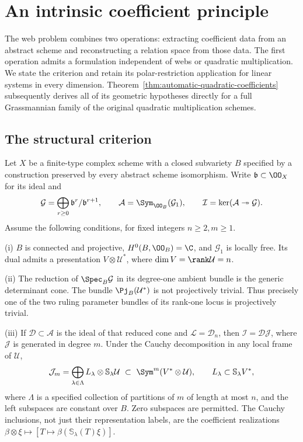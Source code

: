 \section{An intrinsic coefficient principle}
\label{sec:structural-coefficient-principle}

The web problem combines two operations: extracting coefficient data
from an abstract scheme and reconstructing a relation space from those
data.  The first operation admits a formulation independent of webs or
quadratic multiplication.  We state the criterion and retain its
polar-restriction application for linear systems in every dimension.
Theorem~\ref{thm:automatic-quadratic-coefficients} subsequently derives
all of its geometric hypotheses directly for a full Grassmannian
family of the original quadratic multiplication schemes.

\subsection{The structural criterion}

Let \(X\) be a finite-type complex scheme with a closed subvariety
\(B\) specified by a construction preserved by every abstract scheme
isomorphism.  Write \(\mathfrak b\subset\OO_X\) for its ideal and
\[
 \mathcal G=\bigoplus_{r\ge0}\mathfrak b^r/\mathfrak b^{r+1},
 \qquad \mathcal A=\Sym_{\OO_B}(\mathcal G_1),
 \qquad \mathcal I=\ker(\mathcal A\twoheadrightarrow\mathcal G).
\]
Assume the following conditions, for fixed integers \(n\ge2,m\ge1\).

\smallskip
\noindent\textup{(i)} \(B\) is connected and projective,
\(H^0(B,\OO_B)=\C\), and \(\mathcal G_1\) is locally free.
Its dual admits a presentation \(V\otimes\mathcal U^*\), where
\(\dim V=\rank\mathcal U=n\).

\smallskip
\noindent\textup{(ii)} The reduction of \(\Spec_B\mathcal G\)
in its degree-one ambient bundle is the generic determinant cone.
The bundle \(\Pj_B(\mathcal U^*)\) is not projectively trivial.
Thus precisely one of the two ruling parameter bundles of its rank-one
locus is projectively trivial.

\smallskip
\noindent\textup{(iii)} If \(\mathcal D\subset\mathcal A\)
is the ideal of that reduced cone and \(\mathcal L=\mathcal D_n\),
then \(\mathcal I=\mathcal D\mathcal J\), where
\(\mathcal J\) is generated in degree \(m\).  Under the Cauchy
decomposition in any local frame of \(\mathcal U\),
\begin{equation}\label{eq:structural-coefficient-hypothesis}
 \mathcal J_m=
 \bigoplus_{\lambda\in\Lambda}
          L_\lambda\otimes\mathbb S_\lambda\mathcal U
 \ \subset\
 \Sym^m(V^*\otimes\mathcal U),
 \qquad L_\lambda\subset\mathbb S_\lambda V^*,
\end{equation}
where \(\Lambda\) is a specified collection of partitions of \(m\)
of length at most \(n\), and the left subspaces are constant over
\(B\).  Zero subspaces are permitted.  The Cauchy inclusions, not
just their representation labels, are the coefficient realizations
\(\beta\otimes\xi\mapsto[T\mapsto\beta(\mathbb S_\lambda(T)\xi)]\).

